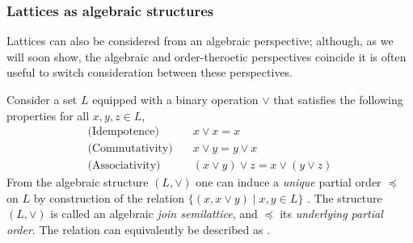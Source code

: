 \subsubsection{Lattices as algebraic structures}
\label{subsubsection:lattices-as-algebraic-structures}

Lattices can also be considered from an algebraic perspective; although, as we will soon show, the algebraic
and order-theroetic perspectives coincide it is often useful to switch consideration between these perspectives.

Consider a set $L$ equipped with a binary operation $\vee$ that satisfies the following properties for
all $x,y,z \in L$,
%
\begin{align}
  \text{(Idempotence)}   & \quad x \vee x = x \label{eq:idempotence}                            \\
  \text{(Commutativity)} & \quad x \vee y = y \vee x \label{eq:commutativity}                   \\
  \text{(Associativity)} & \quad (x \vee y) \vee z = x \vee (y \vee z) \label{eq:associativity}
\end{align}
%
From the algebraic structure $(L, \vee)$ one can induce a \textit{unique} partial order $\preceq$ on
$L$ by construction of the relation $\{(x, x \vee y) \mid x,y \in L \}$ \cite[pp. 173]{bergman2015invitation}.
The structure $(L, \vee)$ is called an algebraic \textit{join semilattice}, and $\preceq$ its
\textit{underlying partial order}. The relation can equivalently be described as 
\cite[pp.173]{bergman2015invitation}.
%
